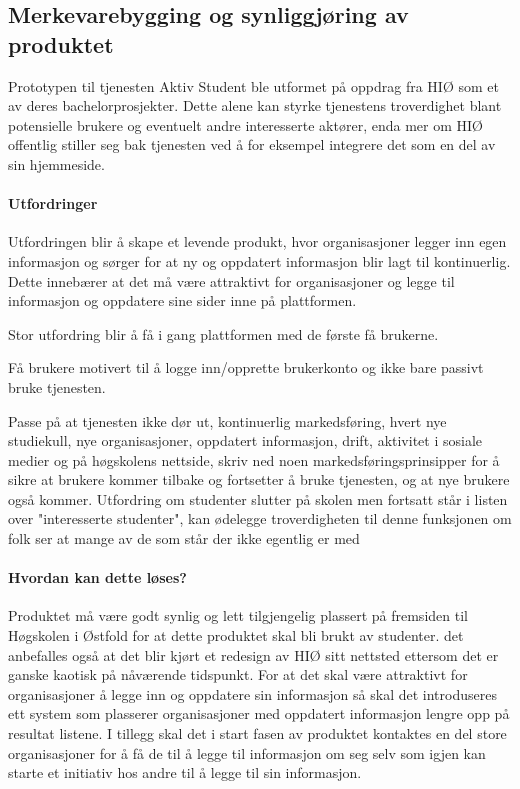 \subsection{Merkevarebygging og synliggjøring av produktet}

Prototypen til tjenesten Aktiv Student ble utformet på oppdrag fra HIØ som et av deres bachelorprosjekter. Dette alene kan styrke tjenestens troverdighet blant potensielle brukere og eventuelt andre interesserte aktører, enda mer om HIØ offentlig stiller seg bak tjenesten ved å for eksempel integrere det som en del av sin hjemmeside.

\paragraph{Utfordringer}
Utfordringen blir å skape et levende produkt, hvor organisasjoner legger inn egen informasjon og sørger for at ny og oppdatert informasjon blir lagt til kontinuerlig. Dette innebærer at det må være attraktivt for organisasjoner og legge til informasjon og oppdatere sine sider inne på plattformen.

Stor utfordring blir å få i gang plattformen med de første få brukerne.

Få brukere motivert til å logge inn/opprette brukerkonto og ikke bare passivt bruke tjenesten.

Passe på at tjenesten ikke dør ut, kontinuerlig markedsføring, hvert nye studiekull, nye organisasjoner, oppdatert informasjon, drift, aktivitet i sosiale medier og på høgskolens nettside, skriv ned noen markedsføringsprinsipper for å sikre at brukere kommer tilbake og fortsetter å bruke tjenesten, og at nye brukere også kommer. Utfordring om studenter slutter på skolen men fortsatt står i listen over "interesserte studenter", kan ødelegge troverdigheten til denne funksjonen om folk ser at mange av de som står der ikke egentlig er med

\paragraph{Hvordan kan dette løses?}

Produktet må være godt synlig og lett tilgjengelig plassert på fremsiden til Høgskolen i Østfold for at dette produktet skal bli brukt av studenter. det anbefalles også at det blir kjørt et redesign av HIØ sitt nettsted ettersom det er ganske kaotisk på nåværende tidspunkt. For at det skal være attraktivt for organisasjoner å legge inn og oppdatere sin informasjon så skal det introduseres ett system som plasserer organisasjoner med oppdatert informasjon lengre opp på resultat listene. I tillegg skal det i start fasen av produktet kontaktes en del store organisasjoner for å få de til å legge til informasjon om seg selv som igjen kan starte et initiativ hos andre til å legge til sin informasjon. 


